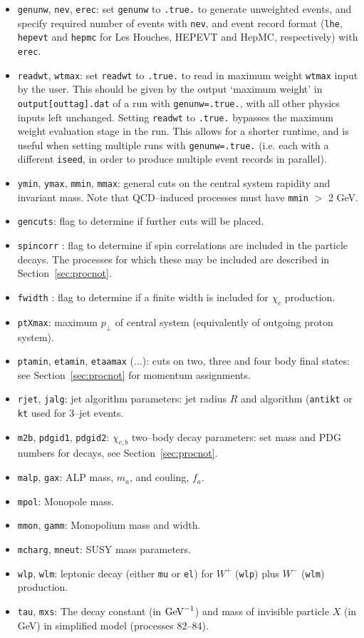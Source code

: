 \documentclass[12pt]{article}
\begin{document}
\begin{itemize}
\item \texttt{genunw}, \texttt{nev}, \texttt{erec}: set \texttt{genunw} to \texttt{.true.} to generate unweighted events, and specify required number of events with \texttt{nev}, and event record format (\texttt{lhe}, \texttt{hepevt} and \texttt{hepmc} for Les Houches, HEPEVT and HepMC, respectively) with \texttt{erec}.
\item \texttt{readwt}, \texttt{wtmax}: set \texttt{readwt} to \texttt{.true.} to read in maximum weight \texttt{wtmax} input by the user. This should be given by the output `maximum weight' in  \texttt{output[outtag].dat} of a run with \texttt{genunw=.true.}, with all other physics inputs left unchanged. Setting \texttt{readwt} to \texttt{.true.} bypasses the maximum weight evaluation stage in the run. This allows for a shorter runtime, and is useful when setting multiple runs with \texttt{genunw=.true.} (i.e. each with a different \texttt{iseed}, in order to produce multiple event records in parallel).
\item \texttt{ymin}, \texttt{ymax}, \texttt{mmin}, \texttt{mmax}: general cuts on the central system rapidity and invariant mass. Note that QCD--induced processes must have \texttt{mmin} $>$ 2 GeV.
\item \texttt{gencuts}: flag to determine if further cuts will be placed.
\item \texttt{spincorr} : flag to determine if spin correlations are included in the particle decays. The processes for which these may be included are described in Section~\ref{sec:procnot}.
\item \texttt{fwidth} : flag to determine if a finite width is included for $\chi_c$ production.
\item \texttt{ptXmax}: maximum $p_\perp$ of central system (equivalently of outgoing proton system).
\item \texttt{ptamin}, \texttt{etamin}, \texttt{etaamax} (...): cuts on two, three and four body final states: see Section~\ref{sec:procnot} for momentum assignments.
\item \texttt{rjet}, \texttt{jalg}: jet algorithm parameters: jet radius $R$ and algorithm (\texttt{antikt} or \texttt{kt}  used for 3--jet events.
\item \texttt{m2b}, \texttt{pdgid1}, \texttt{pdgid2}: $\chi_{c,b}$ two--body decay parameters: set mass and PDG numbers for decays, see Section~\ref{sec:procnot}.
\item \texttt{malp}, \texttt{gax}: ALP mass, $m_a$, and couling, $f_a$.
\item \texttt{mpol}: Monopole mass.
\item \texttt{mmon}, \texttt{gamm}: Monopolium mass and width.
\item \texttt{mcharg}, \texttt{mneut}: SUSY mass parameters.
\item \texttt{wlp}, \texttt{wlm}: leptonic decay (either \texttt{mu} or \texttt{el}) for $W^+$ (\texttt{wlp}) plus $W^-$ (\texttt{wlm}) production.
\item \texttt{tau}, \texttt{mxs}: The decay constant (in ${\rm GeV}^{-1}$) and mass of invisible particle $X$ (in GeV) in simplified model (processes 82--84).
\end{itemize}
\end{document}
